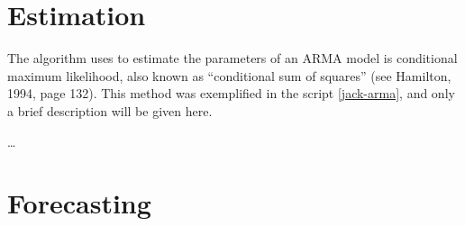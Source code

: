 \section{Estimation}
\label{arma-est}

The algorithm  uses to estimate the parameters of an ARMA
model is conditional maximum likelihood, also known as ``conditional
sum of squares'' (see Hamilton, 1994, page 132). This method was
exemplified in the script \ref{jack-arma}, and only a brief
description will be given here.

\ldots

\section{Forecasting}
\label{arma-fcast}



